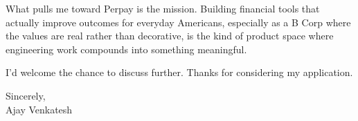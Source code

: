 \documentclass[letterpaper,11pt]{article}
\begin{document}
What pulls me toward Perpay is the mission. Building financial tools that actually improve outcomes for everyday Americans, especially as a B Corp where the values are real rather than decorative, is the kind of product space where engineering work compounds into something meaningful.

I'd welcome the chance to discuss further. Thanks for considering my application.

\vspace{12pt}
Sincerely, \\
Ajay Venkatesh
\end{document}
